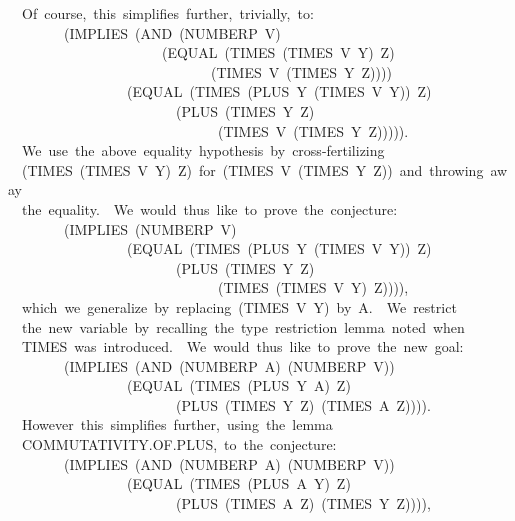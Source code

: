 \documentclass[11pt]{book}
\newenvironment{pubasis}{\begin{flushleft}\ttfamily\small}{\normalsize\rmfamily\end{flushleft}}
\begin{document}
\begin{pubasis}
~~Of~course,~this~simplifies~further,~trivially,~to:\\

~~~~~~~~(IMPLIES~(AND~(NUMBERP~V)\\
~~~~~~~~~~~~~~~~~~~~~~(EQUAL~(TIMES~(TIMES~V~Y)~Z)\\
~~~~~~~~~~~~~~~~~~~~~~~~~~~~~(TIMES~V~(TIMES~Y~Z))))\\
~~~~~~~~~~~~~~~~~(EQUAL~(TIMES~(PLUS~Y~(TIMES~V~Y))~Z)\\
~~~~~~~~~~~~~~~~~~~~~~~~(PLUS~(TIMES~Y~Z)\\
~~~~~~~~~~~~~~~~~~~~~~~~~~~~~~(TIMES~V~(TIMES~Y~Z))))).\\

~~We~use~the~above~equality~hypothesis~by~cross-fertilizing\\
~~(TIMES~(TIMES~V~Y)~Z)~for~(TIMES~V~(TIMES~Y~Z))~and~throwing~away\\
~~the~equality.~~We~would~thus~like~to~prove~the~conjecture:\\

~~~~~~~~(IMPLIES~(NUMBERP~V)\\
~~~~~~~~~~~~~~~~~(EQUAL~(TIMES~(PLUS~Y~(TIMES~V~Y))~Z)\\
~~~~~~~~~~~~~~~~~~~~~~~~(PLUS~(TIMES~Y~Z)\\
~~~~~~~~~~~~~~~~~~~~~~~~~~~~~~(TIMES~(TIMES~V~Y)~Z)))),\\

~~which~we~generalize~by~replacing~(TIMES~V~Y)~by~A.~~We~restrict\\
~~the~new~variable~by~recalling~the~type~restriction~lemma~noted~when\\
~~TIMES~was~introduced.~~We~would~thus~like~to~prove~the~new~goal:\\

~~~~~~~~(IMPLIES~(AND~(NUMBERP~A)~(NUMBERP~V))\\
~~~~~~~~~~~~~~~~~(EQUAL~(TIMES~(PLUS~Y~A)~Z)\\
~~~~~~~~~~~~~~~~~~~~~~~~(PLUS~(TIMES~Y~Z)~(TIMES~A~Z)))).\\

~~However~this~simplifies~further,~using~the~lemma\\
~~COM\-MU\-TA\-TIV\-ITY.OF.PLUS,~to~the~conjecture:\\

~~~~~~~~(IMPLIES~(AND~(NUMBERP~A)~(NUMBERP~V))\\
~~~~~~~~~~~~~~~~~(EQUAL~(TIMES~(PLUS~A~Y)~Z)\\
~~~~~~~~~~~~~~~~~~~~~~~~(PLUS~(TIMES~A~Z)~(TIMES~Y~Z)))),\\


\end{pubasis}
\end{document}

